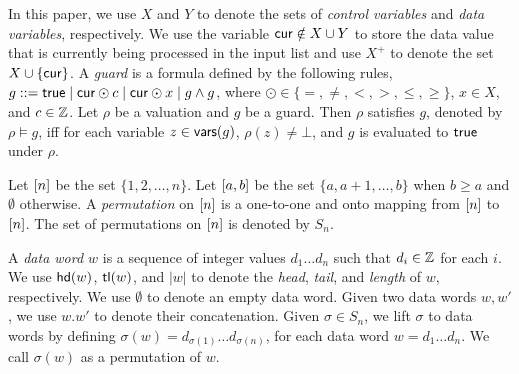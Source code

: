 In this paper, we use $X$ and $Y$ to denote the sets of \emph{control variables} and \emph{data variables}, respectively. We use the variable $\mathsf{cur} \notin X\cup Y$ to store the data value that is currently being processed in the input list and use $X^+$ to denote the set $X\cup \{\mathsf{cur}\}$.
A \emph{guard} is a formula defined by the following rules, $g::= \mathsf{true} \mid \mathsf{cur}\odot c \mid \mathsf{cur}\odot x \mid g \wedge g$, where $\odot \in \{=,\neq,<, >, \le, \ge\}$, $x \in X$, and $c\in {\mathbb{Z} }$. 
Let $\rho$ be a valuation and $g$ be a guard. Then $\rho$ satisfies $g$, denoted by $\rho \models g$, iff for each variable $z \in \mathsf{vars}(g)$, $\rho(z) \neq \bot$, and $g$ is evaluated to $\mathsf{true}$ under $\rho$. 

Let $[n]$ be the set $\{ 1, 2, \ldots, n \}$. Let $[a,b]$ be the set $\{ a, a+1, \ldots, b \}$ when $b\geq a$ and $\emptyset$ otherwise. A \emph{permutation} on
$[n]$ is a one-to-one and onto mapping from $[n]$ to
$[n]$. The set of
permutations on $[n]$ is denoted by $S_n$.

A \emph{data word $w$} is a sequence of integer values $d_1\ldots d_n$ such that $d_i \in {\mathbb{Z} }$ for each $i$.
We use $\mathsf{hd}(w)$, $\mathsf{tl}(w)$, and $|w|$ to denote the \emph{head}, \emph{tail}, and \emph{length} of $w$, respectively.
We use $\emptyset$ to denote an empty data word.
Given two data words $w,w'$, we use $w.w'$ to denote their concatenation.
Given $\sigma \in S_n$, we lift $\sigma$ to data words by defining $\sigma(w)=d_{\sigma(1)} \ldots d_{\sigma(n)}$, for each data word $w=d_1\ldots d_n$. We call $\sigma(w)$ as a permutation of $w$.